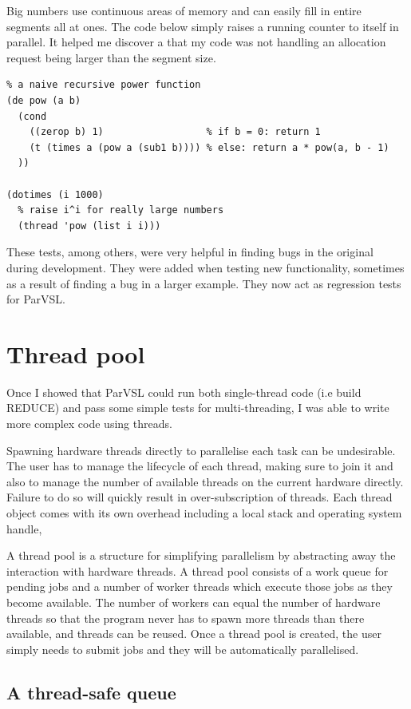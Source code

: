 Big numbers use continuous areas of memory and can easily
fill in entire segments all at ones. The code below simply
raises a running counter to itself in parallel. It helped me discover
a that my code was not handling an allocation request being
larger than the segment size.

\label{lst:number-crunch}
\begin{verbatim}
% a naive recursive power function
(de pow (a b)
  (cond
    ((zerop b) 1)                  % if b = 0: return 1
    (t (times a (pow a (sub1 b)))) % else: return a * pow(a, b - 1)
  ))

(dotimes (i 1000)
  % raise i^i for really large numbers
  (thread 'pow (list i i)))
\end{verbatim}

These tests, among others, were very helpful in finding bugs in the original
during development. They were added when testing new functionality,
sometimes as a result of finding a bug in a larger example.
They now act as regression tests for ParVSL.

\section{Thread pool}

Once I showed  that ParVSL could run both single-thread code (i.e build REDUCE) and pass some
simple tests for multi-threading, I was able to write more complex code using threads.

Spawning hardware threads directly to parallelise each task can be undesirable. The user has
to manage the lifecycle of each thread, making sure to join it and also to manage the number
of available threads on the current hardware directly. Failure to do so will quickly result in
over-subscription of threads. Each thread object comes with its own overhead including a local
stack and operating system handle,

A thread pool is a structure for simplifying parallelism by abstracting away the interaction
with hardware threads. A thread pool consists of a work queue for pending jobs and a number
of worker threads which execute those jobs as they become available. The number of workers
can equal the number of hardware threads so that the program never has to spawn more threads
than there available, and threads can be reused. Once a thread pool is created, the user simply
needs to submit jobs and they will be automatically parallelised.

\subsection{A thread-safe queue}

